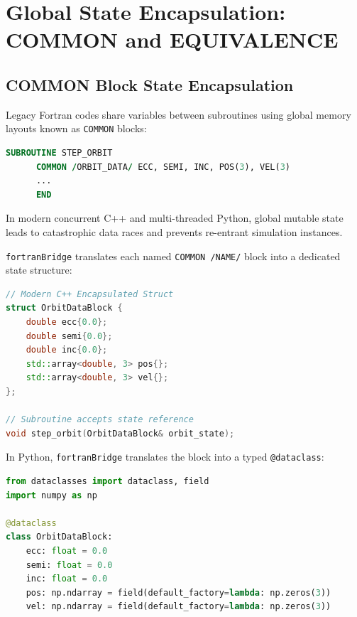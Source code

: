 \documentclass[11pt,a4paper]{article}
\theoremstyle{definition}
\begin{document}
\section{Global State Encapsulation: COMMON and EQUIVALENCE}

\subsection{COMMON Block State Encapsulation}
Legacy Fortran codes share variables between subroutines using global memory layouts known as \texttt{COMMON} blocks:
\begin{lstlisting}[language=Fortran]
      SUBROUTINE STEP_ORBIT
      COMMON /ORBIT_DATA/ ECC, SEMI, INC, POS(3), VEL(3)
      ...
      END
\end{lstlisting}

In modern concurrent C++ and multi-threaded Python, global mutable state leads to catastrophic data races and prevents re-entrant simulation instances.

\texttt{fortranBridge} translates each named \texttt{COMMON /NAME/} block into a dedicated state structure:
\begin{lstlisting}[language=C++]
// Modern C++ Encapsulated Struct
struct OrbitDataBlock {
    double ecc{0.0};
    double semi{0.0};
    double inc{0.0};
    std::array<double, 3> pos{};
    std::array<double, 3> vel{};
};

// Subroutine accepts state reference
void step_orbit(OrbitDataBlock& orbit_state);
\end{lstlisting}

In Python, \texttt{fortranBridge} translates the block into a typed \texttt{@dataclass}:
\begin{lstlisting}[language=Python]
from dataclasses import dataclass, field
import numpy as np

@dataclass
class OrbitDataBlock:
    ecc: float = 0.0
    semi: float = 0.0
    inc: float = 0.0
    pos: np.ndarray = field(default_factory=lambda: np.zeros(3))
    vel: np.ndarray = field(default_factory=lambda: np.zeros(3))
\end{lstlisting}
\end{document}
